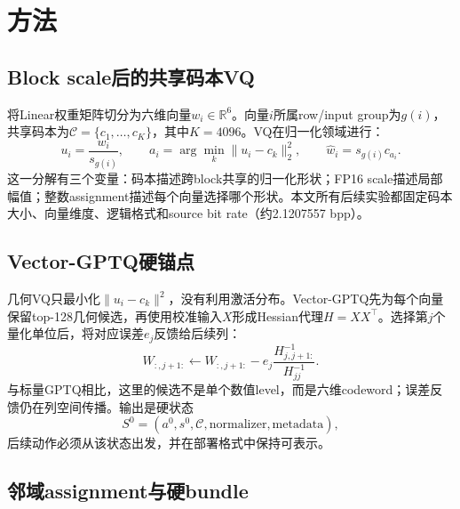 \section{方法}

\subsection{Block scale后的共享码本VQ}

将Linear权重矩阵切分为六维向量$w_i\in\mathbb R^6$。向量$i$所属row/input group为$g(i)$，共享码本为$\mathcal C=\{c_1,\ldots,c_K\}$，其中$K=4096$。VQ在归一化领域进行：
\begin{equation}
u_i=\frac{w_i}{s_{g(i)}},\qquad
a_i=\arg\min_k\|u_i-c_k\|_2^2,\qquad
\hat w_i=s_{g(i)}c_{a_i}.
\end{equation}
这一分解有三个变量：码本描述跨block共享的归一化形状；FP16 scale描述局部幅值；整数assignment描述每个向量选择哪个形状。本文所有后续实验都固定码本大小、向量维度、逻辑格式和source bit rate（约2.1207557 bpp）。

\subsection{Vector-GPTQ硬锚点}

几何VQ只最小化$\|u_i-c_k\|^2$，没有利用激活分布。Vector-GPTQ先为每个向量保留top-128几何候选，再使用校准输入$X$形成Hessian代理$H=XX^\top$。选择第$j$个量化单位后，将对应误差$e_j$反馈给后续列：
\begin{equation}
W_{:,j+1:}\leftarrow W_{:,j+1:}-e_j
\frac{H^{-1}_{j,j+1:}}{H^{-1}_{jj}}.
\end{equation}
与标量GPTQ相比，这里的候选不是单个数值level，而是六维codeword；误差反馈仍在列空间传播。输出是硬状态
\begin{equation}
S^0=(a^0,s^0,\mathcal C,\text{normalizer},\text{metadata}),
\end{equation}
后续动作必须从该状态出发，并在部署格式中保持可表示。

\subsection{邻域assignment与硬bundle}

